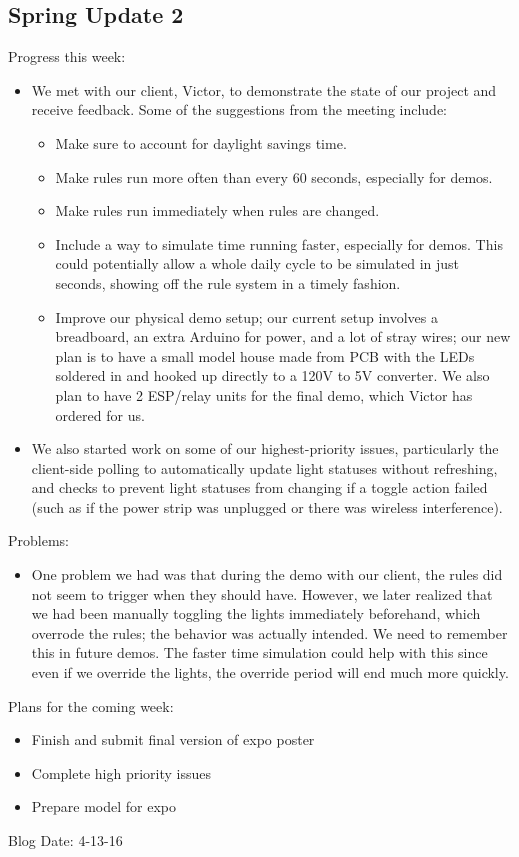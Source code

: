 \subsection{Spring Update 2}
Progress this week:
\begin{itemize}
   \item We met with our client, Victor, to demonstrate the state of our project and receive feedback.  Some of the suggestions from the meeting include:
      \begin{itemize}
         \item Make sure to account for daylight savings time.
         \item Make rules run more often than every 60 seconds, especially for demos.
         \item Make rules run immediately when rules are changed.
         \item Include a way to simulate time running faster, especially for demos.  This could potentially allow a whole daily cycle to be simulated in just seconds, showing off the rule system in a timely fashion.
         \item Improve our physical demo setup; our current setup involves a breadboard, an extra Arduino for power, and a lot of stray wires; our new plan is to have a small model house made from PCB with the LEDs soldered in and hooked up directly to a 120V to 5V converter.  We also plan to have 2 ESP/relay units for the final demo, which Victor has ordered for us.
      \end{itemize}
   \item We also started work on some of our highest-priority issues, particularly the client-side polling to automatically update light statuses without refreshing, and checks to prevent light statuses from changing if a toggle action failed (such as if the power strip was unplugged or there was wireless interference).
\end{itemize}
Problems:
\begin{itemize}
   \item One problem we had was that during the demo with our client, the rules did not seem to trigger when they should have.  However, we later realized that we had been manually toggling the lights immediately beforehand, which overrode the rules; the behavior was actually intended.  We need to remember this in future demos.  The faster time simulation could help with this since even if we override the lights, the override period will end much more quickly.
\end{itemize}
Plans for the coming week:
\begin{itemize}
   \item Finish and submit final version of expo poster
   \item Complete high priority issues
   \item Prepare model for expo
\end{itemize}
Blog Date: 4-13-16

